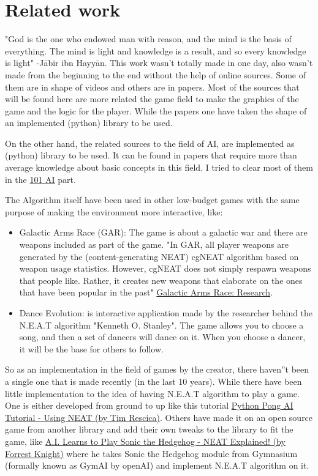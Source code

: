 \chapter{Related work}

"God is the one who endowed man with reason, and the mind is the basis of everything. The mind is light and knowledge is a result, and so every knowledge is light" -Jābir ibn Hayyān. This work wasn't totally made in one day, also wasn't made from the beginning to the end without the help of online sources. Some of them are in shape of videos and others are in papers. Most of the sources that will be found here are more related the game field to make the graphics of the game and the logic for the player. While the papers one have taken the shape of an implemented (python) library to be used.

On the other hand, the related sources to the field of AI, are implemented as (python) library to be used. It can be found in papers that require more than average knowledge about basic concepts in this field. I tried to clear most of them in the \hyperref[sec:101-ai]{101 AI} part.

The Algorithm itself have been used in other low-budget games with the same purpose of making the environment more interactive, like:

\begin{itemize}
\item Galactic Arms Race (GAR): The game is about a galactic war and there are weapons included as part of the game. "In GAR, all player weapons are generated by the (content-generating NEAT) cgNEAT algorithm based on weapon usage statistics. However, cgNEAT does not simply respawn weapons that people like. Rather, it creates new weapons that elaborate on the ones that have been popular in the past" \href{http://galacticarmsrace.blogspot.com/p/research.html}{Galactic Arms Race: Research}.

\item Dance Evolution: is interactive application made by the researcher behind the N.E.A.T algorithm "Kenneth O. Stanley". The game allows you to choose a song, and then a set of dancers will dance on it. When you choose a dancer, it will be the base for others to follow.

\end{itemize}

So as an implementation in the field of games by the creator, there haven''t been a single one that is made recently (in the last 10 years). While there have been little implementation to the idea of having N.E.A.T algorithm to play a game. One is either developed from ground to up like this tutorial \href{https://www.youtube.com/watch?v=2f6TmKm7yx0&t}{Python Pong AI Tutorial - Using NEAT (by Tim Rescica)}.  Others have made it on an open source game from another library and add their own tweaks to the library to fit the game, like \href{https://www.youtube.com/watch?v=5RR1T_-zVws&t}{A.I. Learns to Play Sonic the Hedgehog - NEAT Explained! (by Forrest Knight)} where he takes Sonic the Hedgehog module from Gymnasium (formally known as GymAI by openAI) and implement N.E.A.T algorithm on it.

